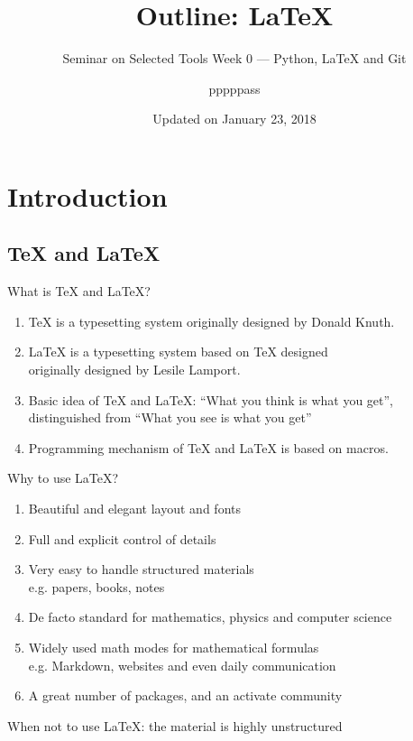 \documentclass[english, nochinese]{../TeXTemplate/pkuslide}
\title{Outline: \texorpdfstring{\LaTeX}{LaTeX}}
\subtitle{Seminar on Selected Tools Week 0 --- Python, \texorpdfstring{\LaTeX}{LaTeX} and Git}
\author{pppppass}
\date{Updated on January 23, 2018}
\begin{document}
\begin{frame}
\titlepage
\end{frame}

\begin{frame}
\tableofcontents[subsectionstyle=show]
\end{frame}

\section{Introduction}

\begin{frame}
\sectionpage
\end{frame}

\subsection{\TeX{} and \LaTeX}

\begin{frame}{What is \TeX{} and \LaTeX?}
\begin{enumerate}
\item \TeX{} is a typesetting system originally designed by Donald Knuth.
\item \LaTeX{} is a typesetting system based on \TeX{} designed \\
originally designed by Lesile Lamport.
\item Basic idea of \TeX{} and \LaTeX{}: ``What you think is what you get'', \\ distinguished from ``What you see is what you get''
\item Programming mechanism of \TeX{} and \LaTeX{} is based on macros.
\end{enumerate}
\end{frame}

\begin{frame}{Why to use \LaTeX?}
\begin{enumerate}
\item Beautiful and elegant layout and fonts
\item Full and explicit control of details
\item Very easy to handle structured materials \\
e.g. papers, books, notes
\item De facto standard for mathematics, physics and computer science
\item Widely used math modes for mathematical formulas \\
e.g. Markdown, websites and even daily communication
\item A great number of packages, and an activate community
\end{enumerate}

When not to use \LaTeX{}: the material is highly unstructured
\end{frame}
\end{document}
